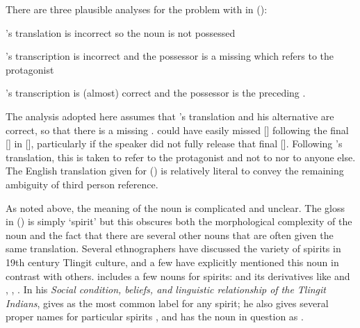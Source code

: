 There are three plausible analyses for the problem with  in (\lastx):
\begin{inlineenum}
\item	\citeauthor{swanton:1909}’s translation is incorrect so the noun  is not possessed
\item	\citeauthor{swanton:1909}’s transcription is incorrect and the possessor is a missing  which refers to the protagonist
\item	\citeauthor{swanton:1909}’s transcription is (almost) correct and the possessor is the preceding .
\end{inlineenum}
The analysis adopted here assumes that \citeauthor{swanton:1909}’s translation and his alternative  are correct, so that there is a missing .
\citeauthor{swanton:1909} could have easily missed [] following the final [] in  [], particularly if the speaker did not fully release that final [].
Following \citeauthor{swanton:1909}’s translation, this  is taken to refer to the protagonist and not to  nor to anyone else.
The English translation given for (\lastx) is relatively literal to convey the remaining ambiguity of third person reference. 

As noted above, the meaning of the noun  is complicated and unclear.
The gloss in (\lastx) is simply ‘spirit’ but this obscures both the morphological complexity of the noun and the fact that there are several other nouns that are often given the same translation.
Several ethnographers have discussed the variety of spirits in 19th century Tlingit culture, and a few have explicitly mentioned this noun in contrast with others.
\citeauthor{veniaminov:1984} includes a few nouns for spirits:  and its derivatives like  and , ,  \parencite[396–398]{veniaminov:1984}.
In his \textit{Social condition, beliefs, and linguistic relationship of the Tlingit Indians}, \citeauthor{swanton:1908} gives  \parencite[451]{swanton:1908} as the most common label for any spirit; he also gives several proper names for particular spirits \parencite[453, 454, 460, 461, 465, 467–469]{swanton:1908}, and has the noun in question as   \parencite[460, 462]{swanton:1908}. 


